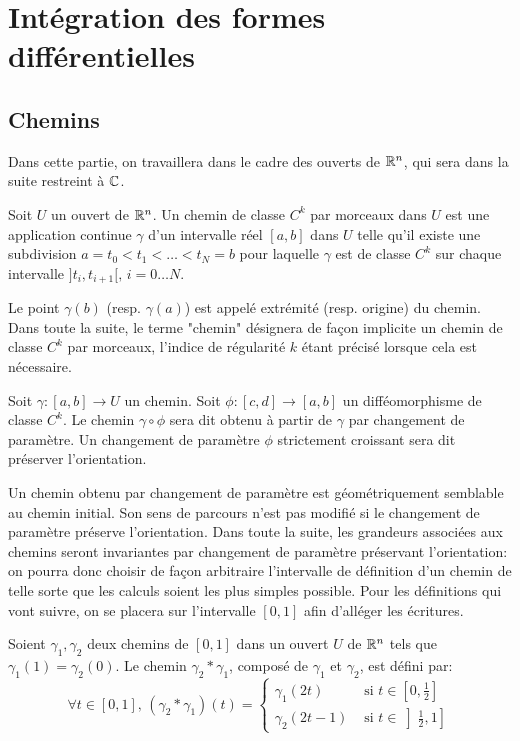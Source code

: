 \chapter{Intégration des formes différentielles}
\section{Chemins}
Dans cette partie, on travaillera dans le cadre des ouverts de $\mathbb{R}^n$, qui sera dans la suite restreint à $\mathbb{C}$. 
\begin{fdefn}
Soit $U$ un ouvert de $\mathbb{R}^n$. Un chemin de classe $C^k$ par morceaux dans $U$ est une application continue $\gamma$ d'un intervalle réel $[a,b]$ dans $U$ telle qu'il existe une subdivision $a=t_0 < t_1 < \dots < t_N = b$ pour laquelle $\gamma$ est de classe $C^k$ sur chaque intervalle $]t_i,t_{i+1}[, \, i=0 \dots N$.
\end{fdefn}
Le point $\gamma(b)$ (resp. $\gamma(a)$) est appelé extrémité (resp. origine) du chemin.
Dans toute la suite, le terme "chemin" désignera de façon implicite un chemin de classe $C^k$ par morceaux, l'indice de régularité $k$ étant précisé lorsque cela est nécessaire. 
\begin{fdefn}
Soit $\gamma \colon [a,b] \to U$ un chemin. Soit $\phi \colon [c,d] \to [a,b]$ un difféomorphisme de classe $C^k$. Le chemin $\gamma \circ \phi$ sera dit obtenu à partir de $\gamma$ par changement de paramètre. Un changement de paramètre $\phi$ strictement croissant sera dit préserver l'orientation.
\end{fdefn}
Un chemin obtenu par changement de paramètre est géométriquement semblable au chemin initial. Son sens de parcours n'est pas modifié si le changement de paramètre préserve l'orientation. Dans toute la suite, les grandeurs associées aux chemins seront invariantes par changement de paramètre préservant l'orientation: on pourra donc choisir de façon arbitraire l'intervalle de définition d'un chemin de telle sorte que les calculs soient les plus simples possible. Pour les définitions qui vont suivre, on se placera sur l'intervalle $[0,1]$ afin d'alléger les écritures. 

\begin{fdefn}
Soient $\gamma_1, \gamma_2$ deux chemins de $[0,1]$ dans un ouvert $U$ de $\mathbb{R}^n$ tels que $\gamma_1(1) =
\gamma_2(0)$. Le chemin $\gamma_2 * \gamma_1$, composé de $\gamma_1$ et
$\gamma_2$, est défini par:
\[
\forall t \in [0,1], \, (\gamma_2 * \gamma_1)(t) = \left \{
\begin{array}{cc}
\gamma_1(2t) & \text{ si } t \in \left[0,\frac{1}{2}\right] \\
\gamma_2(2t-1) & \text{ si } t \in \left]\frac{1}{2},1\right]
\end{array}
\right.
\]
\end{fdefn}




